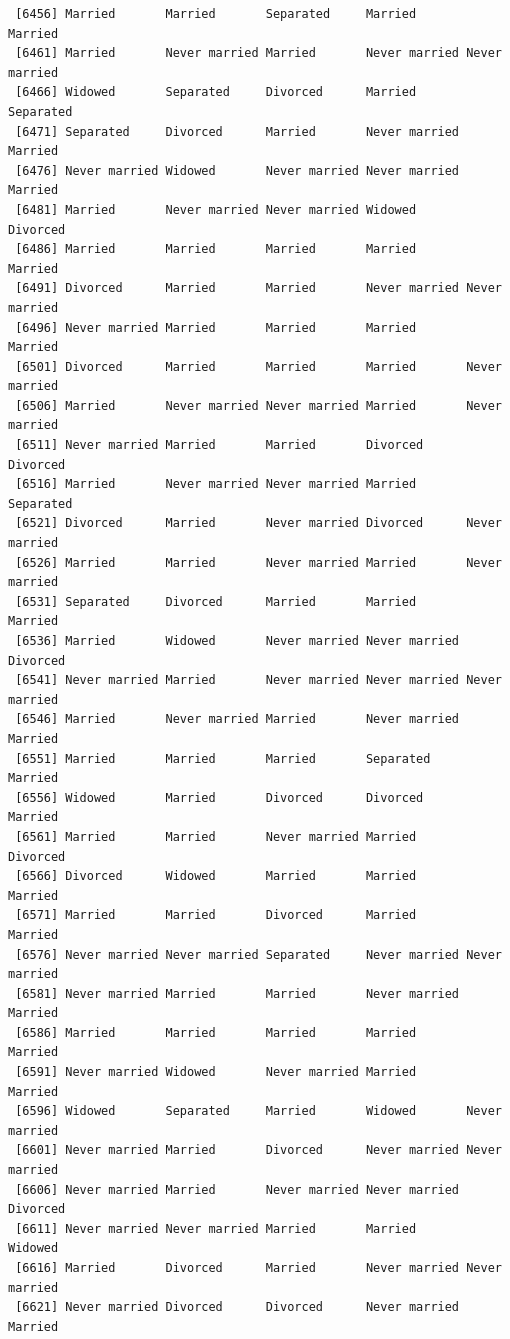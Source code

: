 \documentclass[
  letterpaper,
  DIV=11,
  numbers=noendperiod,
  oneside]{scrartcl}
\begin{document}
\begin{verbatim}
 [6456] Married       Married       Separated     Married       Married      
 [6461] Married       Never married Married       Never married Never married
 [6466] Widowed       Separated     Divorced      Married       Separated    
 [6471] Separated     Divorced      Married       Never married Married      
 [6476] Never married Widowed       Never married Never married Married      
 [6481] Married       Never married Never married Widowed       Divorced     
 [6486] Married       Married       Married       Married       Married      
 [6491] Divorced      Married       Married       Never married Never married
 [6496] Never married Married       Married       Married       Married      
 [6501] Divorced      Married       Married       Married       Never married
 [6506] Married       Never married Never married Married       Never married
 [6511] Never married Married       Married       Divorced      Divorced     
 [6516] Married       Never married Never married Married       Separated    
 [6521] Divorced      Married       Never married Divorced      Never married
 [6526] Married       Married       Never married Married       Never married
 [6531] Separated     Divorced      Married       Married       Married      
 [6536] Married       Widowed       Never married Never married Divorced     
 [6541] Never married Married       Never married Never married Never married
 [6546] Married       Never married Married       Never married Married      
 [6551] Married       Married       Married       Separated     Married      
 [6556] Widowed       Married       Divorced      Divorced      Married      
 [6561] Married       Married       Never married Married       Divorced     
 [6566] Divorced      Widowed       Married       Married       Married      
 [6571] Married       Married       Divorced      Married       Married      
 [6576] Never married Never married Separated     Never married Never married
 [6581] Never married Married       Married       Never married Married      
 [6586] Married       Married       Married       Married       Married      
 [6591] Never married Widowed       Never married Married       Married      
 [6596] Widowed       Separated     Married       Widowed       Never married
 [6601] Never married Married       Divorced      Never married Never married
 [6606] Never married Married       Never married Never married Divorced     
 [6611] Never married Never married Married       Married       Widowed      
 [6616] Married       Divorced      Married       Never married Never married
 [6621] Never married Divorced      Divorced      Never married Married      

\end{verbatim}
\end{document}
